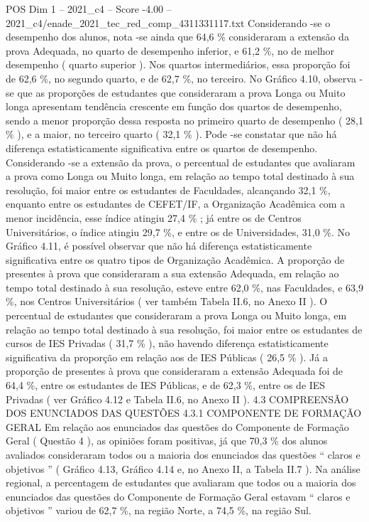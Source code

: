 \begin{textsample}{POS Dim 1 – 2021\_c4 – Score -4.00 – 2021\_c4/enade\_2021\_tec\_red\_comp\_4311331117.txt}
Considerando -se o desempenho dos alunos, nota -se ainda que 64,6 \% consideraram a extensão da prova Adequada, no quarto de desempenho inferior, e 61,2 \%, no de melhor desempenho ( quarto superior ).
Nos quartos intermediários, essa proporção foi de 62,6 \%, no segundo quarto, e de 62,7 \%, no terceiro.
No Gráfico 4.10, observa -se que as proporções de estudantes que consideraram a prova Longa ou Muito longa apresentam tendência crescente em função dos quartos de desempenho, sendo a menor proporção dessa resposta no primeiro quarto de desempenho ( 28,1 \% ), e a maior, no terceiro quarto ( 32,1 \% ).
Pode -se constatar que não há diferença estatisticamente significativa entre os quartos de desempenho.
Considerando -se a extensão da prova, o percentual de estudantes que avaliaram a prova como Longa ou Muito longa, em relação ao tempo total destinado à sua resolução, foi maior entre os estudantes de Faculdades, alcançando 32,1 \%, enquanto entre os estudantes de CEFET/IF, a Organização Acadêmica com a menor incidência, esse índice atingiu 27,4 \% ; já entre os de Centros Universitários, o índice atingiu 29,7 \%, e entre os de Universidades, 31,0 \%.
No Gráfico 4.11, é possível observar que não há diferença estatisticamente significativa entre os quatro tipos de Organização Acadêmica.
A proporção de presentes à prova que consideraram a sua extensão Adequada, em relação ao tempo total destinado à sua resolução, esteve entre 62,0 \%, nas Faculdades, e 63,9 \%, nos Centros Universitários ( ver também Tabela II.6, no Anexo II ).
O percentual de estudantes que consideraram a prova Longa ou Muito longa, em relação ao tempo total destinado à sua resolução, foi maior entre os estudantes de cursos de IES Privadas ( 31,7 \% ), não havendo diferença estatisticamente significativa da proporção em relação aos de IES Públicas ( 26,5 \% ).
Já a proporção de presentes à prova que consideraram a extensão Adequada foi de 64,4 \%, entre os estudantes de IES Públicas, e de 62,3 \%, entre os de IES Privadas ( ver Gráfico 4.12 e Tabela II.6, no Anexo II ). 4.3 COMPREENSÃO DOS ENUNCIADOS DAS QUESTÕES 4.3.1 COMPONENTE DE FORMAÇÃO GERAL Em relação aos enunciados das questões do Componente de Formação Geral ( Questão 4 ), as opiniões foram positivas, já que 70,3 \% dos alunos avaliados consideraram todos ou a maioria dos enunciados das questões “ claros e objetivos ” ( Gráfico 4.13, Gráfico 4.14 e, no Anexo II, a Tabela II.7 ).
Na análise regional, a percentagem de estudantes que avaliaram que todos ou a maioria dos enunciados das questões do Componente de Formação Geral estavam “ claros e objetivos ” variou de 62,7 \%, na região Norte, a 74,5 \%, na região Sul.

\end{textsample}

